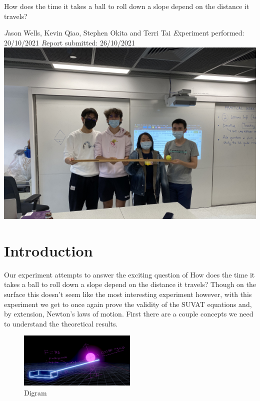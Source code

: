 \documentclass[12pt]{report}
\begin{document}
\begin{center}
    {\Large How does the time it takes a ball to roll down a slope depend on the distance it travels?}

    \vspace{1cm}
    {\emph Jason Wells, Kevin Qiao, Stephen Okita and Terri Tai}\newline
    {\emph Experiment performed: 20/10/2021}\newline
    {\emph Report submitted: 26/10/2021}
    \vspace{2cm}
    \includegraphics[width=\textwidth]{Img.png}

\end{center}
\tableofcontents
\section{Introduction}
Our experiment attempts to answer the exciting question of How does the time it takes a ball to roll down a slope depend on the distance it travels? Though on the surface this doesn't seem like the most interesting experiment however, with this experiment we get to once again prove the validity of the SUVAT equations and, by extension, Newton's laws of motion. First there are a couple concepts we need to understand the theoretical results.
\begin{figure}
    \centering
    \includegraphics[width=0.5\textwidth]{digram.png}
    \caption{Digram}
\end{figure}
\newline
\end{document}
